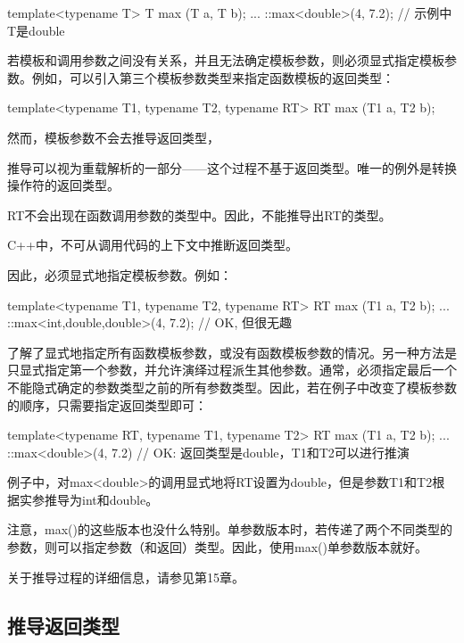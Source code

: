 \begin{cpp}
template<typename T>
T max (T a, T b);
...
::max<double>(4, 7.2); // 示例中T是double
\end{cpp}

若模板和调用参数之间没有关系，并且无法确定模板参数，则必须显式指定模板参数。例如，可以引入第三个模板参数类型来指定函数模板的返回类型：

\begin{cpp}
template<typename T1, typename T2, typename RT>
RT max (T1 a, T2 b);
\end{cpp}

然而，模板参数不会去推导返回类型，

\begin{notice}
推导可以视为重载解析的一部分——这个过程不基于返回类型。唯一的例外是转换操作符的返回类型。
\end{notice}

RT不会出现在函数调用参数的类型中。因此，不能推导出RT的类型。

\begin{notice}
C++中，不可从调用代码的上下文中推断返回类型。
\end{notice}

因此，必须显式地指定模板参数。例如：

\begin{cpp}
template<typename T1, typename T2, typename RT>
RT max (T1 a, T2 b);
...
::max<int,double,double>(4, 7.2); // OK, 但很无趣
\end{cpp}

了解了显式地指定所有函数模板参数，或没有函数模板参数的情况。另一种方法是只显式指定第一个参数，并允许演绎过程派生其他参数。通常，必须指定最后一个不能隐式确定的参数类型之前的所有参数类型。因此，若在例子中改变了模板参数的顺序，只需要指定返回类型即可：

\begin{cpp}
template<typename RT, typename T1, typename T2>
RT max (T1 a, T2 b);
...
::max<double>(4, 7.2) // OK: 返回类型是double，T1和T2可以进行推演
\end{cpp}

例子中，对max<double>的调用显式地将RT设置为double，但是参数T1和T2根据实参推导为int和double。

注意，max()的这些版本也没什么特别。单参数版本时，若传递了两个不同类型的参数，则可以指定参数（和返回）类型。因此，使用max()单参数版本就好。

关于推导过程的详细信息，请参见第15章。

\subsection{推导返回类型}

